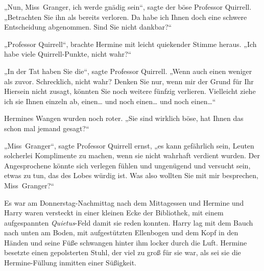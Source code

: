 „Nun, Miss~Granger, ich werde gnädig sein“, sagte der böse Professor Quirrell. „Betrachten Sie ihn als bereits verloren. Da habe ich Ihnen doch eine schwere Entscheidung abgenommen. Sind Sie nicht dankbar?“

„Professor Quirrell“, brachte Hermine mit leicht quiekender Stimme heraus. „Ich habe viele Quirrell-Punkte, nicht wahr?“

„In der Tat haben Sie die“, sagte Professor Quirrell. „Wenn auch einen weniger als zuvor. Schrecklich, nicht wahr? Denken Sie nur, wenn mir der Grund für Ihr Hiersein nicht zusagt, könnten Sie noch weitere fünfzig verlieren. Vielleicht ziehe ich sie Ihnen einzeln ab, einen… und noch einen… und noch einen…“

Hermines Wangen wurden noch roter. „Sie sind wirklich böse, hat Ihnen das schon mal jemand gesagt?“

„Miss~Granger“, sagte Professor Quirrell ernst, „es kann gefährlich sein, Leuten solcherlei Komplimente zu machen, wenn sie nicht wahrhaft verdient wurden. Der Angesprochene könnte sich verlegen fühlen und ungenügend und versucht sein, etwas zu tun, das des Lobes würdig ist. Was also wollten Sie mit mir besprechen, Miss~Granger?“

\later

Es war am Donnerstag-Nachmittag nach dem Mittagessen und Hermine und Harry waren versteckt in einer kleinen Ecke der Bibliothek, mit einem aufgespannten \emph{Quietus}-Feld damit sie reden konnten. Harry lag mit dem Bauch nach unten am Boden, mit aufgestützten Ellenbogen und dem Kopf in den Händen und seine Füße schwangen hinter ihm locker durch die Luft. Hermine besetzte einen gepolsterten Stuhl, der viel zu groß für sie war, als sei sie die Hermine-Füllung inmitten einer Süßigkeit.

